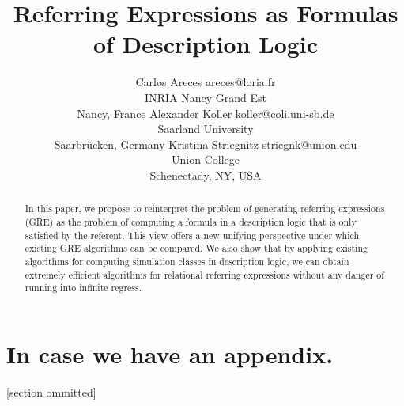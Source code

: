 \documentclass[11pt]{article}
\begin{document}
\title{Referring Expressions as Formulas of Description Logic}

\author{\name Carlos Areces \email areces@loria.fr \\
       \addr INRIA Nancy Grand Est\\
       Nancy, France
       \AND
       \name Alexander Koller \email koller@coli.uni-sb.de \\
       \addr Saarland University\\
       Saarbr\"{u}cken, Germany
       \AND
       \name Kristina Striegnitz \email striegnk@union.edu \\
       \addr Union College\\
       Schenectady, NY, USA}


\maketitle


\begin{abstract}
In this paper, we propose to reinterpret the problem of generating
referring expressions (GRE) as the problem of computing a formula in a
description logic that is only satisfied by the referent. This view
offers a new unifying perspective under which existing GRE algorithms
can be compared. We also show that by applying existing algorithms for
computing simulation classes in description logic, we can obtain
extremely efficient algorithms for relational referring expressions
without any danger of running into infinite regress.
\end{abstract}














\appendix
\section*{In case we have an appendix.}

[section ommitted]



\vskip 0.2in


\end{document}
